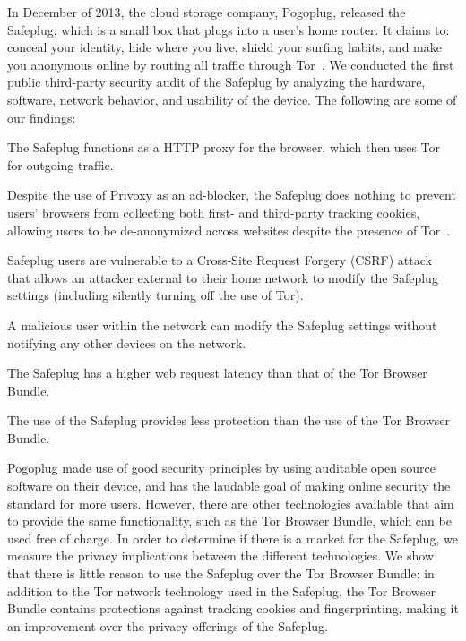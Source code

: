 \documentclass[letterpaper,twocolumn,10pt]{article}
\begin{document}
In December of 2013, the cloud storage company, Pogoplug, released the Safeplug, which is a small box that plugs into a user's home router.  It claims to: conceal your identity, hide where you live, shield your surfing habits, and make you anonymous online by routing all traffic through Tor~\cite{safeplug}.  We conducted the first public third-party security audit of the Safeplug by analyzing the hardware, software, network behavior, and usability of the device.  The following are some of our findings:

\begin{compactitem} \setlength{\itemsep}{.2mm}
\item The Safeplug functions as a HTTP proxy for the browser, which then uses Tor for outgoing traffic.
\item Despite the use of Privoxy as an ad-blocker, the Safeplug does nothing to prevent users' browsers from collecting both first- and third-party tracking cookies, allowing users to be de-anonymized across websites despite the presence of Tor~\cite{arvindpets}.
\item Safeplug users are vulnerable to a Cross-Site Request Forgery (CSRF) attack that allows an attacker external to their home network to modify the Safeplug settings (including silently turning off the use of Tor).
\item A malicious user within the network can modify the Safeplug settings without notifying any other devices on the network.
\item The Safeplug has a higher web request latency than that of the Tor Browser Bundle.
\item The use of the Safeplug provides less protection than the use of the Tor Browser Bundle.
\end{compactitem} 

Pogoplug made use of good security principles by using auditable open source software on their device, and has the laudable goal of making online security the standard for more users. However, there are other technologies available that aim to provide the same functionality, such as the Tor Browser Bundle, which can be used free of charge.  In order to determine if there is a market for the Safeplug, we measure the privacy implications between the different technologies.  We show that there is little reason to use the Safeplug over the Tor Browser Bundle; in addition to the Tor network technology used in the Safeplug, the Tor Browser Bundle contains protections against tracking cookies and fingerprinting, making it an improvement over the privacy offerings of the Safeplug.
\end{document}
